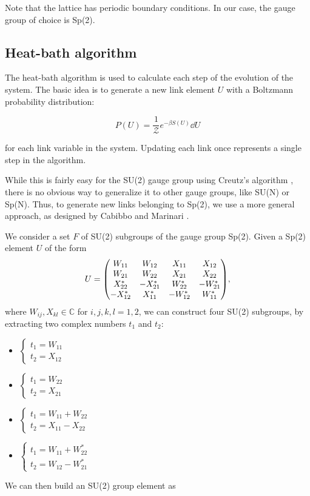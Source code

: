 \documentclass[reqno,12pt]{article}
\numberwithin{equation}{section}
\begin{document}
Note that the lattice has periodic boundary conditions. In our case, the gauge group of choice is Sp(2).

\subsection{Heat-bath algorithm}

The heat-bath algorithm is used to calculate each step of the evolution of the system.
The basic idea is to generate a new link element $U$ with a Boltzmann probability distribution:

\begin{equation}
	P(U) = \frac{1}{\mathcal{Z}} e^{-\beta S(U)} \dd{U}
\end{equation}  

for each link variable in the system. Updating each link once represents a single step in the algorithm. 

While this is fairly easy for the SU(2) gauge group using Creutz's algorithm \cite{creutz}, there is no obvious
way to generalize it to other gauge groups, like SU(N) or Sp(N). Thus, to generate new links belonging to Sp(2), we use
a more general approach, as designed by Cabibbo and Marinari \cite{cabibbo}.  

We consider a set $F$ of SU(2) subgroups of the gauge group Sp(2). Given a Sp(2) element $U$ of the form
\begin{equation}
	U = \mqty(
		W_{11} & W_{12} & X_{11} & X_{12} \\
		W_{21} & W_{22} & X_{21} & X_{22} \\
		X^*_{22} & -X^*_{21} & W^*_{22} & -W^*_{21} \\
		-X^*_{12} & X^*_{11} & -W^*_{12} & W^*_{11}
	),
\end{equation}
where $W_{ij}, X_{kl} \in \mathbb{C}$ for $i,j,k,l = 1, 2$, 
we can construct four SU(2) subgroups, by extracting two complex numbers $t_1$ and $t_2$:
\begin{itemize}
	\item $\begin{cases} t_1 = W_{11} \\ t_2 = X_{12} \end{cases}$
	\item $\begin{cases} t_1 = W_{22} \\ t_2 = X_{21} \end{cases}$
	\item $\begin{cases} t_1 = W_{11} + W_{22} \\ t_2 = X_{11} - X_{22} \end{cases}$
	\item $\begin{cases} t_1 = W_{11} + W^*_{22} \\ t_2 = W_{12} - W^*_{21} \end{cases}$
\end{itemize}
We can then build an SU(2) group element as
\end{document}
